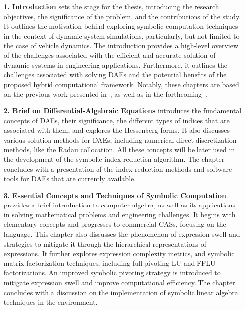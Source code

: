 \begin{enumerate}
  \setlength\itemsep{0em}
  \item[\textbf{1.}] \textbf{Introduction} sets the stage for the thesis, introducing the research objectives, the significance of the problem, and the contributions of the study. It outlines the motivation behind exploring symbolic computation techniques in the context of dynamic system simulations, particularly, but not limited to the case of vehicle dynamics. The introduction provides a high-level overview of the challenges associated with the efficient and accurate solution of dynamic systems in engineering applications. Furthermore, it outlines the challenges associated with solving \acp{DAE} and the potential benefits of the proposed hybrid computational framework. Notably, these chapters are based on the previous work presented in~\cite{stocco2024symbolic, stocco2024matrix}, as well as in the forthcoming~\cite{stocco2024imece_solution, larcher2024imece_symbolic}.
  \item[\textbf{2.}] \textbf{Brief on Differential-Algebraic Equations} introduces the fundamental concepts of \acp{DAE}, their significance, the different types of indices that are associated with them, and explores the Hessenberg forms. It also discusses various solution methods for \acp{DAE}, including numerical direct discretization methods, like the Radau collocation. All these concepts will be later used in the development of the symbolic index reduction algorithm. The chapter concludes with a presentation of the index reduction methods and software tools for \acp{DAE} that are currently available.
  \item[\textbf{3.}] \textbf{Essential Concepts and Techniques of Symbolic Computation} provides a brief introduction to computer algebra, as well as its applications in solving mathematical problems and engineering challenges. It begins with elementary concepts and progresses to commercial \acp{CAS}, focusing on the \Maple{} language. This chapter also discusses the phenomenon of expression swell and strategies to mitigate it through the hierarchical representations of expressions. It further explores expression complexity metrics, and symbolic matrix factorization techniques, including full-pivoting \ac{LU} and \ac{FFLU} factorizations. An improved symbolic pivoting strategy is introduced to mitigate expression swell and improve computational efficiency. The chapter concludes with a discussion on the implementation of symbolic linear algebra techniques in the \Maple{} environment.

\end{enumerate}
